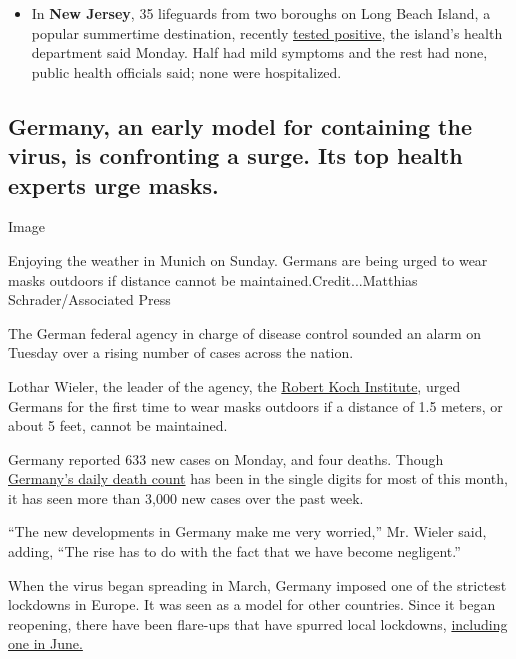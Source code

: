 \begin{itemize}
\tightlist
\item
  In \textbf{New Jersey}, 35 lifeguards from two boroughs on Long Beach
  Island, a popular summertime destination, recently
  \href{http://lbihealth.com/wp-content/uploads/2020/07/pressrelease727.pdf}{tested
  positive}, the island's health department said Monday. Half had mild
  symptoms and the rest had none, public health officials said; none
  were hospitalized.
\end{itemize}

\hypertarget{germany-an-early-model-for-containing-the-virus-is-confronting-a-surge-its-top-health-experts-urge-masks}{%
\subsection{Germany, an early model for containing the virus, is
confronting a surge. Its top health experts urge
masks.}\label{germany-an-early-model-for-containing-the-virus-is-confronting-a-surge-its-top-health-experts-urge-masks}}

Image

Enjoying the weather in Munich on Sunday. Germans are being urged to
wear masks outdoors if distance cannot be maintained.Credit...Matthias
Schrader/Associated Press

The German federal agency in charge of disease control sounded an alarm
on Tuesday over a rising number of cases across the nation.

Lothar Wieler, the leader of the agency, the
\href{https://www.rki.de/EN/Home/homepage_node.html}{Robert Koch
Institute}, urged Germans for the first time to wear masks outdoors if a
distance of 1.5 meters, or about 5 feet, cannot be maintained.

Germany reported 633 new cases on Monday, and four deaths. Though
\href{https://www.nytimes3xbfgragh.onion/interactive/2020/world/europe/germany-coronavirus-cases.html}{Germany's
daily death count} has been in the single digits for most of this month,
it has seen more than 3,000 new cases over the past week.

``The new developments in Germany make me very worried,'' Mr. Wieler
said, adding, ``The rise has to do with the fact that we have become
negligent.''

When the virus began spreading in March, Germany imposed one of the
strictest lockdowns in Europe. It was seen as a model for other
countries. Since it began reopening, there have been flare-ups that have
spurred local lockdowns,
\href{https://www.nytimes3xbfgragh.onion/2020/06/25/world/europe/germany-coronavirus-reopening.html}{including
one in June.}

